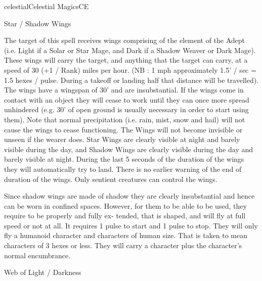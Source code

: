 \begin{College}[1.3]{celestial}{Celestial Magics}{CE}
\begin{spell}[S-5]{Star / Shadow Wings}
\begin{effects}
 The  target  of  this  spell  receives  wings 
comprising  of  the  element  of  the  Adept  (i.e.  Light 
if  a  Solar  or  Star  Mage,  and  Dark  if  a  Shadow 
Weaver or Dark Mage). These wings will carry the 
target,  and  anything  that  the  target  can  carry,  at  a 
speed  of  30  (+1  /  Rank)  miles  per  hour.  (NB  :  1 
mph  approximately  1.5’  /  sec  =  1.5  hexes  /  pulse. 
During  a  takeoff  or  landing  half  that  distance  will 
be  travelled).  The  wings  have  a  wingspan  of  30’ 
and are insubstantial. If the wings come in contact 
with  an  object  they  will  cease  to  work  until  they 
can once more spread unhindered (e.g. 30’ of open 
ground  is  usually  necessary  in  order  to  start  using 
them).  Note  that  normal  precipitation  (i.e.  rain, 
mist,  snow  and  hail)  will  not  cause  the  wings  to 
cease  functioning.  The  Wings  will  not  become 
invisible  or  unseen  if the  wearer  does.  Star Wings 
are clearly visible at night and barely visible during 
the  day,  and  Shadow  Wings  are  clearly  visible 
during  the  day  and  barely  visible  at  night.  During 
the last 5 seconds of the duration of the wings they 
will  automatically  try  to  land.  There  is  no  earlier 
warning of the end of duration of the  wings. Only 
sentient creatures can control the wings. 

Since  shadow  wings  are  made  of  shadow  they  are 
clearly  insubstantial  and  hence  can  be  worn  in 
confined  spaces.  However,  for  them  to  be  able  to 
be  used,  they  require  to  be  properly  and  fully  ex-
tended, that is shaped, and will fly at full speed or 
not at all. It requires 1 pulse to start and 1 pulse to 
stop.  They  will  only  fly  a  humanoid character  and 
characters  of  human  size.  That  is  taken  to  mean 
characters  of  3  hexes  or  less.  They  will  carry  a 
character plus the character’s normal encumbrance. 
\end{effects}
\end{spell}

\begin{spell}[S-6]{Web of Light / Darkness}


\end{spell}
\end{College}
